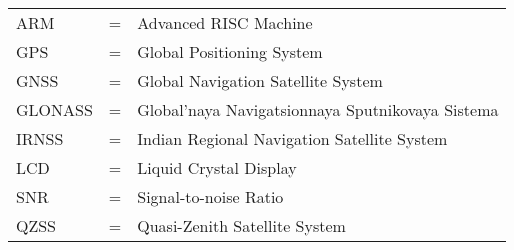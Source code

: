 
\begin{tabular}{llp{3in}}
	ARM	&  \hspace{1.5cm} = & Advanced RISC Machine\\
	GPS	&  \hspace{1.5cm} = & Global Positioning System\\
	GNSS	&  \hspace{1.5cm} = & Global Navigation Satellite System\\
	GLONASS	&  \hspace{1.5cm} = & Global'naya Navigatsionnaya Sputnikovaya Sistema\\
	IRNSS	&  \hspace{1.5cm} = & Indian Regional Navigation Satellite System\\
	LCD	&  \hspace{1.5cm} = & Liquid Crystal Display\\
	SNR	&  \hspace{1.5cm} = & Signal-to-noise Ratio\\
	QZSS	&  \hspace{1.5cm} = & Quasi-Zenith Satellite System\\
\end{tabular}
